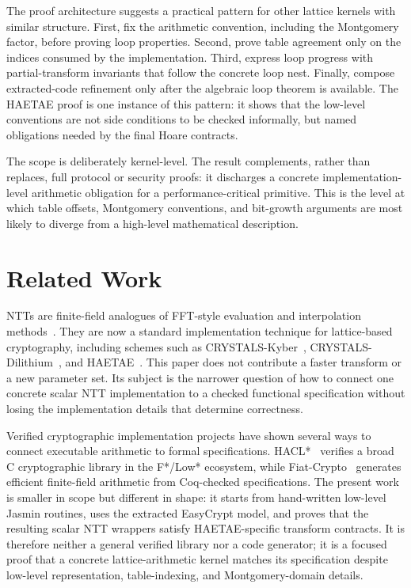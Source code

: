\documentclass[10pt,twocolumn]{article}
\newcommand{\haetae}{HAETAE}
\newcommand{\ec}{EasyCrypt}
\newcommand{\jasmin}{Jasmin}
\begin{document}
The proof architecture suggests a practical pattern for other lattice kernels
with similar structure. First, fix the arithmetic convention, including the
Montgomery factor, before proving loop properties. Second, prove table agreement
only on the indices consumed by the implementation. Third, express loop progress
with partial-transform invariants that follow the concrete loop nest. Finally,
compose extracted-code refinement only after the algebraic loop theorem is
available. The \haetae{} proof is one instance of this pattern: it shows that
the low-level conventions are not side conditions to be checked informally, but
named obligations needed by the final Hoare contracts.

The scope is deliberately kernel-level. The result complements, rather than
replaces, full protocol or security proofs: it discharges a concrete
implementation-level arithmetic obligation for a performance-critical primitive.
This is the level at which table offsets, Montgomery conventions, and bit-growth
arguments are most likely to diverge from a high-level mathematical description.

\section{Related Work}

NTTs are finite-field analogues of FFT-style evaluation and interpolation
methods~\cite{Pollard1971}. They are now a standard implementation technique
for lattice-based cryptography, including schemes such as
CRYSTALS-Kyber~\cite{Kyber2018}, CRYSTALS-Dilithium~\cite{Dilithium2018}, and
\haetae{}~\cite{HAETAE2022}. This paper does not contribute a faster transform
or a new parameter set. Its subject is the narrower question of how to connect
one concrete scalar NTT implementation to a checked functional
specification without losing the implementation details that determine
correctness.

Verified cryptographic implementation projects have shown several ways to
connect executable arithmetic to formal specifications. HACL*~\cite{HACL2017}
verifies a broad C cryptographic library in the F*/Low* ecosystem, while
Fiat-Crypto~\cite{FiatCrypto2019} generates efficient finite-field arithmetic
from Coq-checked specifications. The present work is smaller in scope but
different in shape: it starts from hand-written low-level \jasmin{} routines,
uses the extracted \ec{} model, and proves that the resulting scalar NTT
wrappers satisfy HAETAE-specific transform contracts. It is therefore neither a
general verified library nor a code generator; it is a focused proof that a
concrete lattice-arithmetic kernel matches its specification despite low-level
representation, table-indexing, and Montgomery-domain details.
\end{document}
